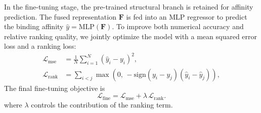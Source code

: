 \documentclass[preprint,12pt]{elsarticle}
\theoremstyle{plain}
\theoremstyle{definition}
\theoremstyle{remark}
\begin{document}
In the fine-tuning stage, the pre-trained structural branch is retained for affinity prediction. The fused representation $\mathbf{F}$ is fed into an MLP regressor to predict the binding affinity $\hat{y}=\mathrm{MLP}(\mathbf{F})$. To improve both numerical accuracy and relative ranking quality, we jointly optimize the model with a mean squared error loss and a ranking loss:
\begin{align}
\mathcal{L}_{\mathrm{mse}} &=
\frac{1}{N}\sum_{i=1}^{N}(\hat{y}_i-y_i)^2, \\
\mathcal{L}_{\mathrm{rank}} &=
\sum_{i<j}
\max\!\left(0,\,-\mathrm{sign}(y_i-y_j)(\hat{y}_i-\hat{y}_j)\right),
\end{align}
The final fine-tuning objective is
\begin{equation}
\mathcal{L}_{\mathrm{fine}}
=
\mathcal{L}_{\mathrm{mse}} + \lambda\,\mathcal{L}_{\mathrm{rank}}.
\end{equation}
where $\lambda$ controls the contribution of the ranking term.

\end{document}
